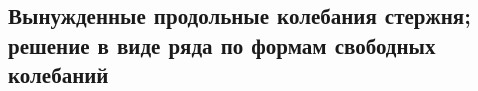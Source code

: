 

\subsection{Вынужденные продольные колебания стержня; решение в виде ряда по формам свободных колебаний}



